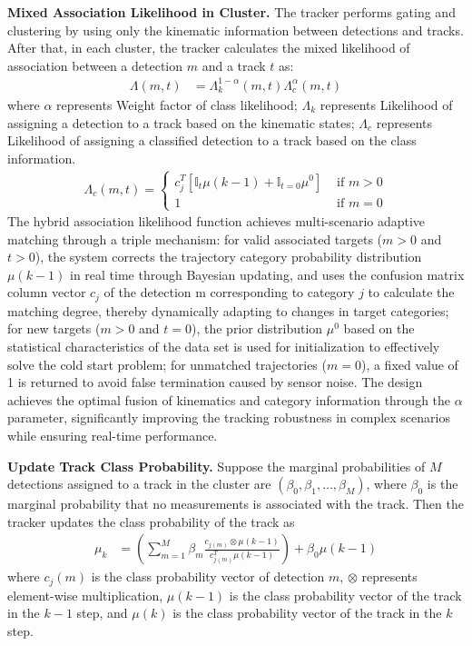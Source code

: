 \documentclass[lettersize,journal]{IEEEtran}
\begin{document}
\textbf{Mixed Association Likelihood in Cluster.}
The tracker performs gating and clustering by using only the kinematic information between detections and tracks. 
After that, in each cluster, the tracker calculates the mixed likelihood of association between a detection \(m\) and a track \(t\) as:
\begin{align}
	\Lambda(m, t) & = \Lambda_{k}^{1-\alpha}(m, t) \Lambda_{c}^{\alpha}(m, t)
\end{align}
where \(\alpha\) represents Weight factor of class likelihood; \(\Lambda_{k}\) represents Likelihood of assigning a detection to a track based on the kinematic states; \(\Lambda_{c}\) represents Likelihood of assigning a classified detection to a track based on the class information.
\begin{align}
	\Lambda_{c}(m, t) = \left\{\begin{array}{ll}
		c_{j}^{T}\left[\mathbb{I}_t \mu(k-1)+\mathbb{I}_{t = 0} \mu^{0}\right] & \text { if } m>0 \\
		1 & \text { if } m = 0
	\end{array}\right.
\end{align}
The hybrid association likelihood function achieves multi-scenario adaptive matching through a triple mechanism: for valid associated targets (\(m>0\) and \(t>0\)), the system corrects the trajectory category probability distribution \(\mu(k-1)\) in real time through Bayesian updating, and uses the confusion matrix column vector \(c_j\) of the detection m corresponding to category \(j\) to calculate the matching degree, thereby dynamically adapting to changes in target categories; for new targets (\(m>0\) and \(t=0\)), the prior distribution \(\mu^{0}\) based on the statistical characteristics of the data set is used for initialization to effectively solve the cold start problem; for unmatched trajectories (\(m=0\)), a fixed value of 1 is returned to avoid false termination caused by sensor noise. The design achieves the optimal fusion of kinematics and category information through the \(\alpha\) parameter, significantly improving the tracking robustness in complex scenarios while ensuring real-time performance.

\textbf{Update Track Class Probability.}
Suppose the marginal probabilities of \(M\) detections assigned to a track in the cluster are \(\left(\beta_{0}, \beta_{1}, \ldots, \beta_{M}\right)\), where \(\beta_{0}\) is the marginal probability that no measurements is associated with the track. 
Then the tracker updates the class probability of the track as
\begin{align}
	\mu_{k} & = \left(\sum_{m = 1}^{M} \beta_{m} \frac{c_{j(m)} \otimes \mu(k-1)}{c_{j(m)}^{T} \mu(k-1)}\right)+\beta_{0} \mu(k-1)
\end{align}
where \(c_{j}(m)\) is the class probability vector of detection \(m\), \(\otimes\) represents element-wise multiplication, \(\mu(k-1)\) is the class probability vector of the track in the \(k-1\) step, and \(\mu(k)\) is the class probability vector of the track in the \(k\) step.
\end{document}
